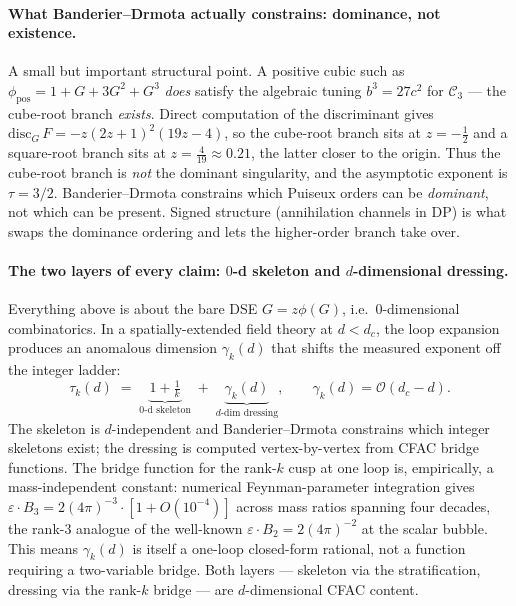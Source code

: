 \documentclass[11pt,a4paper]{article}
\newcommand{\Ck}{\mathcal{C}}
\theoremstyle{plain}
\theoremstyle{remark}
\begin{document}
\paragraph{What Banderier--Drmota actually constrains: dominance,
not existence.}
A small but important structural point.  A positive cubic such
as $\phi_{\text{pos}} = 1 + G + 3G^{2} + G^{3}$ \emph{does}
satisfy the algebraic tuning $b^{3}=27c^{2}$ for $\Ck_{3}$ ---
the cube-root branch \emph{exists}.  Direct computation of the
discriminant gives
$\mathrm{disc}_{G}\,F = -z(2z+1)^{2}(19z-4)$,
so the cube-root branch sits at $z=-\tfrac{1}{2}$ and a
square-root branch sits at $z=\tfrac{4}{19}\approx 0.21$, the
latter closer to the origin.  Thus the cube-root branch is
\emph{not} the dominant singularity, and the asymptotic exponent
is $\tau=3/2$.  Banderier--Drmota constrains which Puiseux
orders can be \emph{dominant}, not which can be present.  Signed
structure (annihilation channels in DP) is what swaps the
dominance ordering and lets the higher-order branch take over.

\paragraph{The two layers of every claim: $0$-d skeleton and
$d$-dimensional dressing.}
Everything above is about the bare DSE $G = z\phi(G)$, i.e.\
$0$-dimensional combinatorics.  In a spatially-extended
field theory at $d < d_{c}$, the loop expansion produces an
anomalous dimension $\gamma_{k}(d)$ that shifts the measured
exponent off the integer ladder:
\begin{equation}
  \tau_{k}(d) \;=\;
  \underbrace{1 + \tfrac{1}{k}}_{\text{0-d skeleton}}
  \;+\;
  \underbrace{\gamma_{k}(d)}_{d\text{-dim dressing}},
  \qquad
  \gamma_{k}(d) = \mathcal{O}(d_{c}-d).
  \label{eq:two-layer-landscape}
\end{equation}
The skeleton is $d$-independent and Banderier--Drmota constrains
which integer skeletons exist; the dressing is computed
vertex-by-vertex from CFAC bridge functions.  The bridge
function for the rank-$k$ cusp at one loop is, empirically, a
mass-independent constant: numerical Feynman-parameter integration
gives $\varepsilon \cdot B_{3} = 2(4\pi)^{-3} \cdot[1 + O(10^{-4})]$
across mass ratios spanning four decades, the rank-$3$ analogue
of the well-known $\varepsilon \cdot B_{2} = 2(4\pi)^{-2}$ at
the scalar bubble.  This means $\gamma_{k}(d)$ is itself a
one-loop closed-form rational, not a function requiring a
two-variable bridge.  Both layers --- skeleton via the
stratification, dressing via the rank-$k$ bridge --- are
$d$-dimensional CFAC content.
\end{document}
